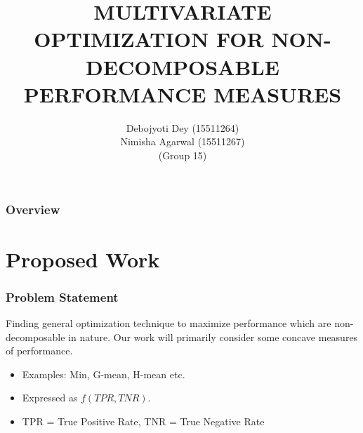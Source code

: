 \documentclass{beamer}
\title[Short title]{MULTIVARIATE OPTIMIZATION FOR NON-DECOMPOSABLE PERFORMANCE MEASURES} %
\author{Debojyoti Dey (15511264)\\ Nimisha Agarwal (15511267)\\ (Group 15)} %
\begin{document}
	
	\begin{frame}
		\titlepage %
	\end{frame}
	
	\begin{frame}
		\frametitle{Overview} %
		\tableofcontents %
	\end{frame}


\section{Proposed Work} %

\begin{frame}
	\frametitle{Problem Statement}
	Finding general optimization technique to maximize performance which are non-decomposable in nature. Our work will primarily consider some concave measures of performance.

\begin{itemize}
\item Examples: Min, G-mean, H-mean etc.
\item Expressed as $f(TPR,TNR)$.
\item TPR = True Positive Rate, TNR = True Negative Rate
\end{itemize}

\end{frame}

\end{document}
